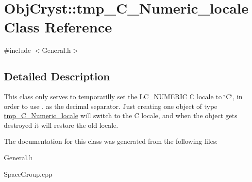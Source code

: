 \hypertarget{class_obj_cryst_1_1tmp___c___numeric__locale}{}\section{Obj\+Cryst\+::tmp\+\_\+\+C\+\_\+\+Numeric\+\_\+locale Class Reference}
\label{class_obj_cryst_1_1tmp___c___numeric__locale}


{\ttfamily \#include $<$General.\+h$>$}



\subsection{Detailed Description}
This class only serves to temporarilly set the L\+C\+\_\+\+N\+U\+M\+E\+R\+IC C locale to \char`\"{}\+C\char`\"{}, in order to use \textquotesingle{}.\textquotesingle{} as the decimal separator. Just creating one object of type \mbox{\hyperlink{class_obj_cryst_1_1tmp___c___numeric__locale}{tmp\+\_\+\+C\+\_\+\+Numeric\+\_\+locale}} will switch to the C locale, and when the object gets destroyed it will restore the old locale. 

The documentation for this class was generated from the following files\+:\begin{DoxyCompactItemize}
\item 
General.\+h\item 
Space\+Group.\+cpp\end{DoxyCompactItemize}

